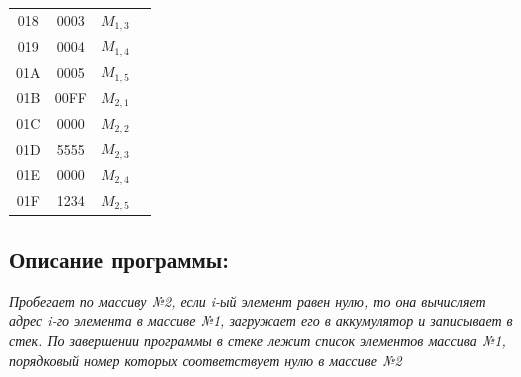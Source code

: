\begin{center}
\begin{tabular}{|c|c|c|l|}
        018                   & 0003                  & $M_{1,3}$          &                                                   \\
        019                   & 0004                  & $M_{1,4}$          &                                                   \\
        01A                   & 0005                  & $M_{1,5}$          &                                                   \\
        \hline
        01B                   & 00FF                  & $M_{2,1}$          &                                                   \\
        01C                   & 0000                  & $M_{2,2}$          &                                                   \\
        01D                   & 5555                  & $M_{2,3}$          &                                                   \\
        01E                   & 0000                  & $M_{2,4}$          &                                                   \\
        01F                   & 1234                  & $M_{2,5}$          &                                                   \\
        \hline
    \end{tabular}
\end{center}

\subsection{Описание программы:}
\textit{
Пробегает по массиву №2, если i-ый элемент равен нулю, то она вычисляет адрес i-го элемента в массиве №1, загружает
его в аккумулятор и записывает в стек. По завершении программы в стеке лежит список элементов массива №1, порядковый
номер которых соответствует нулю в массиве №2}